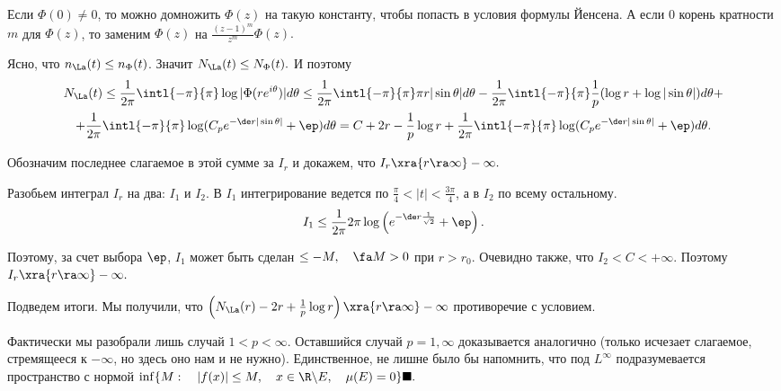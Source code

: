 \documentclass{article}
\begin{document}
Если $\Phi(0)\neq0$, то можно домножить $\Phi(z)$ на такую
константу, чтобы попасть в условия формулы Йенсена. А если $0$ корень кратности $m$ для $\Phi(z)$, то заменим $\Phi(z)$ на
$\frac{(z-1)^m}{z^m}\Phi(z).$

Ясно, что $n_{\La}(t)\le n_{\Phi}(t)$. Значит
$N_{\La}(t)\le N_{\Phi}(t).$ И поэтому
\begin{multline*}
N_{\La}(t)\le\frac1{2\pi}\intl{-\pi}{\pi}\log|\Phi(re^{i\theta})|d\theta\le
\frac1{2\pi}\intl{-\pi}{\pi}\pi
r|\sin\theta|d\theta-\frac1{2\pi}\intl{-\pi}{\pi}\frac1p(\log
r+\log|\sin\theta|)d\theta+\\
+\frac1{2\pi}\intl{-\pi}{\pi}\log(C_pe^{-\de
r|\sin\theta|}+\ep)d\theta=C+2r-\frac1p\log
r+\frac1{2\pi}\intl{-\pi}{\pi}\log(C_pe^{-\de
r|\sin\theta|}+\ep)d\theta.
\end{multline*}

Обозначим последнее слагаемое в этой сумме за $I_r$ и докажем, что
$I_r\xra{r\ra\infty} -\infty.$

Разобьем интеграл $I_r$ на два: $I_1$ и $I_2$. В $I_1$
интегрирование ведется по $\frac{\pi}4<|t|<\frac{3\pi}4$, а в
$I_2$ по всему остальному.
$$I_1\le\frac1{2\pi}2\pi\log\left(e^{-\de
r\frac1{\sqrt{2}}}+\ep\right).$$

Поэтому, за счет выбора $\ep$, $I_1$ может быть сделан
$\le-M,\quad\fa M>0$ при $r>r_0$. Очевидно также, что
$I_2<C<+\infty.$ Поэтому $I_r\xra{r\ra\infty}
-\infty.$

Подведем итоги. Мы получили, что $\left(N_{\La}(r)-2r+\frac1p
\log r\right)\xra{r\ra\infty}-\infty$ противоречие с условием.

Фактически мы разобрали лишь случай $1<p<\infty.$ Оставшийся
случай $p=1,\infty$ доказывается аналогично (только исчезает
слагаемое, стремящееся к $-\infty$, но здесь оно нам и не нужно).
Единственное, не лишне было бы напомнить, что под $L^{\infty}$
подразумевается пространство с нормой $\inf\{M:\quad|f(x)|\le
M,\quad x\in\R \backslash E,\quad\mu(E)=0\}\blacksquare.$
\end{document}
